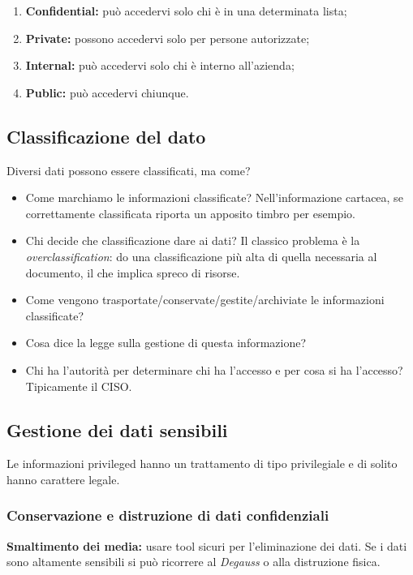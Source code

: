 \begin{enumerate}
\item \textbf{Confidential:} può accedervi solo chi è in una determinata lista;
\item \textbf{Private:} possono accedervi solo per persone autorizzate;
\item \textbf{Internal:} può accedervi solo chi è interno all'azienda;
\item \textbf{Public:} può accedervi chiunque.
\end{enumerate}


\subsection{Classificazione del dato}

Diversi dati possono essere classificati, ma come?

\begin{itemize}
\item Come marchiamo le informazioni classificate? Nell'informazione cartacea,
se correttamente classificata riporta un apposito timbro per esempio.
\item Chi decide che classificazione dare ai dati? Il classico problema è la
\textit{overclassification}: do una classificazione più alta di quella 
necessaria al documento, il che implica spreco di risorse.
\item Come vengono trasportate/conservate/gestite/archiviate le informazioni
classificate?
\item Cosa dice la legge sulla gestione di questa informazione?
\item Chi ha l'autorità per determinare chi ha l'accesso e per cosa si ha
l'accesso? Tipicamente il CISO.
\end{itemize}

\subsection{Gestione dei dati sensibili}

Le informazioni privileged hanno un trattamento di tipo privilegiale e di
solito hanno carattere legale.

\subsubsection{Conservazione e distruzione di dati confidenziali}

\textbf{Smaltimento dei media:} usare tool sicuri per l'eliminazione dei dati. 
Se i dati sono altamente sensibili si può ricorrere al \textit{Degauss} o alla 
distruzione fisica.\\
\newline 

